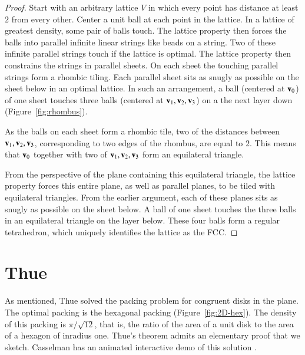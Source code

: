 \begin{proof}
Start with an arbitrary lattice $V$ in which every point has distance 
at least $2$ from every other.  Center a unit ball at each point in
the lattice.  In a lattice of greatest density, some pair of balls
touch.  The lattice property then forces the balls into parallel
infinite linear strings like beads on a string.  Two of these infinite
parallel strings touch if the lattice is  optimal.  The
lattice property then constrains the strings in parallel sheets.  On
each sheet the touching parallel strings form a rhombic tiling.  Each
parallel sheet sits as snugly as possible on the sheet below in an optimal
lattice.  In such an arrangement, a ball (centered at
${\mathbf v}_0$) of one sheet touches three balls (centered at
${\mathbf v}_1,{\mathbf v}_2,{\mathbf v}_3$) on a the next layer down (Figure~\ref{fig:rhombus}).

\figAFRJFRK %


As the balls on each sheet form a rhombic tile, two of the distances
between ${\mathbf v}_1,{\mathbf v}_2,{\mathbf v}_3$, corresponding to two edges of the rhombus, are
equal to $2$.  This means that ${\mathbf v}_0$ together with two of
${\mathbf v}_1,{\mathbf v}_2,{\mathbf v}_3$ form an equilateral triangle.  

From the perspective of the plane containing this equilateral
triangle, the lattice property forces this entire plane, as well as
parallel planes, to be tiled with equilateral triangles.  From the
earlier argument, each of these planes sits as snugly as possible on
the sheet below.  A ball of one sheet touches the three balls in an
equilateral triangle on the layer below.  These four balls form a
regular tetrahedron, which uniquely identifies the lattice as the FCC.
\end{proof}






\section{Thue}\label{sec:thue}


As mentioned, Thue solved the packing problem for congruent disks in
the plane.  The optimal packing is the hexagonal packing
(Figure~\ref{fig:2D-hex}).  The density of this packing is
$\pi/\sqrt{12}$, that is, the ratio of the area of a unit disk to the area of a
hexagon of inradius one.  Thue's theorem admits an elementary proof that
we sketch.    Casselman has an animated interactive demo of this
solution \cite{casselman:pennies}.

